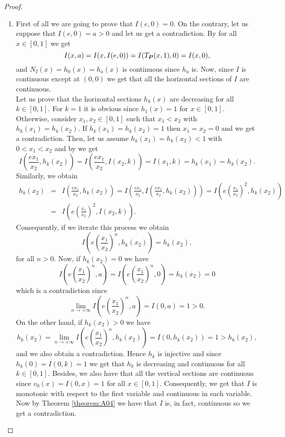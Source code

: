 \begin{proof}
	\begin{enumerate}[label=(\roman*)]
		\item First of all we are going to prove that $I(e,0)=0$. On the contrary, let us suppose that $I(e,0)=a>0$ and let us get a contradiction.
		By \LIey for all $x \in [0,1]$ we get
		$$I(x,a)=I(x,I(e,0))=I(T_{\bm{P}}(x,1),0)=I(x,0),$$
		and $N_I(x)=h_0(x)=h_a(x)$ is continuous since $h_a$ is. Now, since $I$ is continuous except at $(0,0)$ we get that all the horizontal sections of $I$ are continuous.\\
		Let us prove that the horizontal sections $h_k(x)$ are decreasing for all $k \in [0,1]$. For $k=1$ it is obvious since $h_1(x)=1$ for $x\in [0,1]$.  Otherwise, consider $x_1,x_2 \in [0,1]$ such that $x_1<x_2$ with $h_k(x_1)=h_k(x_2)$. If $h_k(x_1)=h_k(x_2)=1$ then $x_1=x_2=0$ and we get a contradiction. Then, let us assume $h_k(x_1)=h_k(x_2)<1$ with $0<x_1<x_2$ and by \LIex we get
		$$ I \left( \frac{ex_1}{x_2},h_k(x_2) \right) = I\left( \frac{ex_1}{x_2},I(x_2,k)\right) = I(x_1,k)=h_k(x_1)=h_k(x_2).$$
		Similarly, we obtain
		\begin{eqnarray*}
		 h_k(x_2) &=& I \left(\frac{ex_1}{x_2},h_k(x_2)\right) = I \left( \frac{ex_1}{x_2}, I\left( \frac{ex_1}{x_2},h_k(x_2)\right)\right) = I \left( e \left(\frac{x_1}{x_2}\right)^2,h_k(x_2) \right) \\
		 &=& I \left( e \left( \frac{x_1}{x_2}\right)^2, I(x_2,k)\right).
		 \end{eqnarray*}
		Consequently, if we iterate this process we obtain
		$$ I\left( e \left(\frac{x_1}{x_2}\right)^n , h_k(x_2)\right) = h_k(x_2),$$
		for all $n>0$. Now, if $h_k(x_2)=0$ we have
		$$ I \left( e \left(\frac{x_1}{x_2}\right)^n,a\right) = I \left( e \left(\frac{x_1}{x_2}\right)^n,0\right) =h_k(x_2)=0$$
		which is a contradiction since
		$$ \lim_{n\to+\infty}  I \left( e \left(\frac{x_1}{x_2}\right)^n,a\right) = I(0,a)=1>0.$$
		On the other hand, if $h_k(x_2)>0$ we have
		$$ h_k(x_2)=\lim_{n\to+\infty}  I \left( e \left(\frac{x_1}{x_2}\right)^n,h_k(x_2)\right) = I(0, h_k(x_2))=1 >h_k(x_2),$$
		and we also obtain a contradiction. Hence $h_k$ is injective and since $h_k(0)=I(0,k)=1$ we get that $h_k$ is decreasing and continuous for all $k \in [0,1]$. Besides, we also have that all the vertical sections are continuous since $v_0(x)= I(0,x)=1$ for all $x \in [0,1]$. Consequently, we get that $I$ is monotonic with respect to the first variable and continuous in each variable. Now by Theorem \ref{theorem:A04} we have that $I$ is, in fact, continuous so we get a contradiction.

\end{enumerate}
\end{proof}
